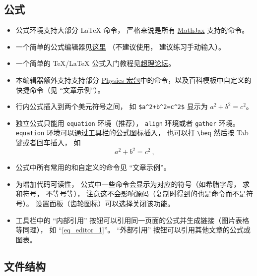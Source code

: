 \subsection{公式}
\begin{itemize}
\item 公式环境支持大部分 LaTeX 命令， 严格来说是所有 \href{https://www.mathjax.org/}{MathJax} 支持的命令。
\item 一个简单的公式编辑器见\href{https://www.codecogs.com/latex/eqneditor.php}{这里} （不建议使用， 建议练习手动输入）。
\item 一个简单的 TeX/LaTeX 公式入门教程见\href{https://chaoli.club/index.php/211}{超理论坛}。
\item 本编辑器额外支持支持部分 \href{http://mirrors.ibiblio.org/CTAN/macros/latex/contrib/physics/physics.pdf}{Physics 宏包}中的命令，以及百科模板中自定义的快捷命令（见 “文章示例”）。
\item 行内公式插入到两个美元符号之间， 如 \verb|$a^2+b^2=c^2$| 显示为 $a^2 + b^2 = c^2$。
\item 独立公式只能用 \verb|equation| 环境（推荐）， \verb|align| 环境或者 \verb|gather| 环境。 \verb|equation| 环境可以通过工具栏的公式图标插入， 也可以打 \verb|\beq| 然后按 Tab 键或者回车插入， 如
\begin{equation}\label{eq_editor_1}
a^2 + b^2 = c^2~,
\end{equation}
\item 公式中所有常用的和自定义的命令见 “文章示例”。
\item 为增加代码可读性， 公式中一些命令会显示为对应的符号（如希腊字母， 求和符号， 不等号等）， 注意这不会影响源码（复制时得到的也是命令而不是符号）。 设置面板（齿轮图标）可以选择关闭该功能。
\item 工具栏中的 “内部引用” 按钮可以引用同一页面的公式并生成链接（图片表格等同理）， 如 “\autoref{eq_editor_1}”。 “外部引用” 按钮可以引用其他文章的公式或图表。
\end{itemize}

\subsection{文件结构}

